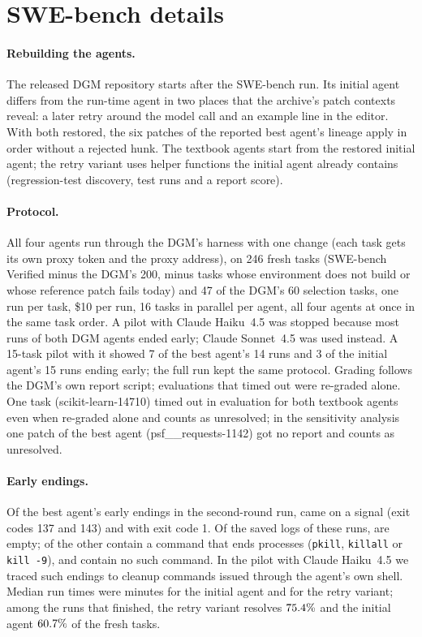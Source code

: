\section{SWE-bench details}\label{app:swe}
\paragraph{Rebuilding the agents.} The released DGM repository starts after the SWE-bench run. Its initial agent
differs from the run-time agent in two places that the archive's patch contexts reveal: a later retry around the model
call and an example line in the editor. With both restored, the six patches of the reported best agent's lineage
apply in order without a rejected hunk. The textbook agents start from the restored initial agent; the retry variant
uses helper functions the initial agent already contains (regression-test discovery, test runs and a report score).

\paragraph{Protocol.} All four agents run through the DGM's harness with one change (each task gets its own proxy token
and the proxy address), on 246 fresh tasks (SWE-bench Verified minus the DGM's 200, minus tasks whose environment does
not build or whose reference patch fails today) and 47 of the DGM's 60 selection tasks, one run per task, \$10 per run,
16 tasks in parallel per agent, all four agents at once in the same task order. A pilot with Claude Haiku~4.5 was
stopped because most runs of both DGM agents ended early; Claude Sonnet~4.5 was used instead. A 15-task pilot with
it showed 7 of the best agent's 14 runs and 3 of the initial agent's 15 runs ending early; the full run kept the same
protocol. Grading follows the DGM's
own report script; evaluations that timed out were re-graded alone. One task (scikit-learn-14710) timed out in
evaluation for both textbook agents even when re-graded alone and counts as unresolved; in the sensitivity analysis one
patch of the best agent (psf\_\_requests-1142) got no report and counts as unresolved.

\paragraph{Early endings.} Of the best agent's \vsweBestEarly{} early endings in the second-round run, \vsweBestEarlySig{} came on
a signal (exit codes 137 and 143) and \vsweBestEarlyOne{} with exit code 1. Of the saved logs of these runs, \vsweKillEmpty{} are
empty; \vsweKillLogs{} of the other \vsweKillNonEmpty{} contain a command that ends processes (\texttt{pkill}, \texttt{killall}
or \texttt{kill -9}), and \vsweKillNone{} contain no such command. In the pilot with Claude Haiku~4.5 we traced such endings to
cleanup commands issued through the agent's own shell. Median run times were \vsweInitMedMin{} minutes for the initial
agent and \vsweRetryMedMin{} for the retry variant; among the runs that finished, the retry variant resolves
$75.4\%$ and the initial agent $60.7\%$ of the fresh tasks.

